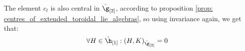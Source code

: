 \begin{remark}
\begin{enumerate}
                The element $c_t$ is also central in $\hat{\g}_{[2]}$, according to proposition \ref{prop: centres_of_extended_toroidal_lie_algebras}, so using invariance again, we get that:
                    $$\forall H \in \tilde{\h}_{[1]}: (H, K)_{\hat{\g}_{[2]}} = 0$$
            \end{enumerate}
        \end{remark}